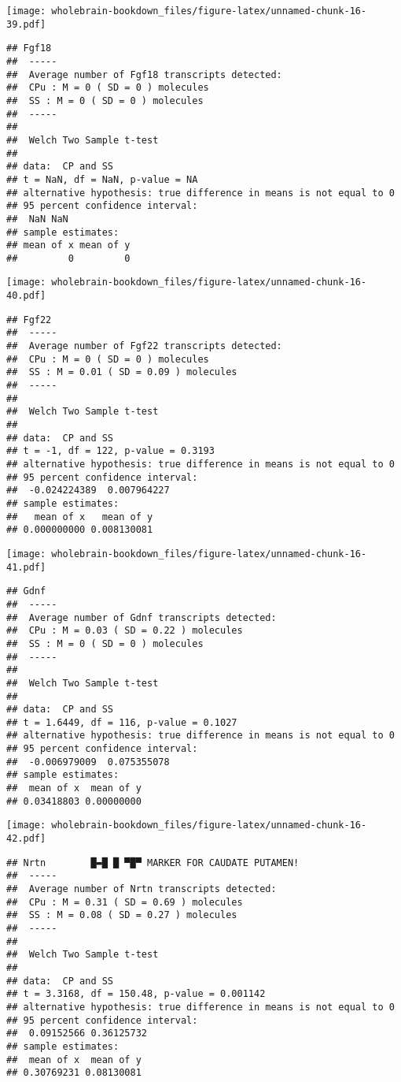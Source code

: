 \documentclass[]{book}
\theoremstyle{definition}
\theoremstyle{definition}
\theoremstyle{remark}
\begin{document}
\texttt{[image: wholebrain-bookdown\_files/figure-latex/unnamed-chunk-16-39.pdf]}

\begin{verbatim}
## Fgf18
##  -----
##  Average number of Fgf18 transcripts detected:
##  CPu : M = 0 ( SD = 0 ) molecules 
##  SS : M = 0 ( SD = 0 ) molecules
##  -----
## 
##  Welch Two Sample t-test
## 
## data:  CP and SS
## t = NaN, df = NaN, p-value = NA
## alternative hypothesis: true difference in means is not equal to 0
## 95 percent confidence interval:
##  NaN NaN
## sample estimates:
## mean of x mean of y 
##         0         0
\end{verbatim}

\texttt{[image: wholebrain-bookdown\_files/figure-latex/unnamed-chunk-16-40.pdf]}

\begin{verbatim}
## Fgf22
##  -----
##  Average number of Fgf22 transcripts detected:
##  CPu : M = 0 ( SD = 0 ) molecules 
##  SS : M = 0.01 ( SD = 0.09 ) molecules
##  -----
## 
##  Welch Two Sample t-test
## 
## data:  CP and SS
## t = -1, df = 122, p-value = 0.3193
## alternative hypothesis: true difference in means is not equal to 0
## 95 percent confidence interval:
##  -0.024224389  0.007964227
## sample estimates:
##   mean of x   mean of y 
## 0.000000000 0.008130081
\end{verbatim}

\texttt{[image: wholebrain-bookdown\_files/figure-latex/unnamed-chunk-16-41.pdf]}

\begin{verbatim}
## Gdnf
##  -----
##  Average number of Gdnf transcripts detected:
##  CPu : M = 0.03 ( SD = 0.22 ) molecules 
##  SS : M = 0 ( SD = 0 ) molecules
##  -----
## 
##  Welch Two Sample t-test
## 
## data:  CP and SS
## t = 1.6449, df = 116, p-value = 0.1027
## alternative hypothesis: true difference in means is not equal to 0
## 95 percent confidence interval:
##  -0.006979009  0.075355078
## sample estimates:
##  mean of x  mean of y 
## 0.03418803 0.00000000
\end{verbatim}

\texttt{[image: wholebrain-bookdown\_files/figure-latex/unnamed-chunk-16-42.pdf]}

\begin{verbatim}
## Nrtn        █▬█ █ ▀█▀ MARKER FOR CAUDATE PUTAMEN!
##  -----
##  Average number of Nrtn transcripts detected:
##  CPu : M = 0.31 ( SD = 0.69 ) molecules 
##  SS : M = 0.08 ( SD = 0.27 ) molecules
##  -----
## 
##  Welch Two Sample t-test
## 
## data:  CP and SS
## t = 3.3168, df = 150.48, p-value = 0.001142
## alternative hypothesis: true difference in means is not equal to 0
## 95 percent confidence interval:
##  0.09152566 0.36125732
## sample estimates:
##  mean of x  mean of y 
## 0.30769231 0.08130081
\end{verbatim}
\end{document}
